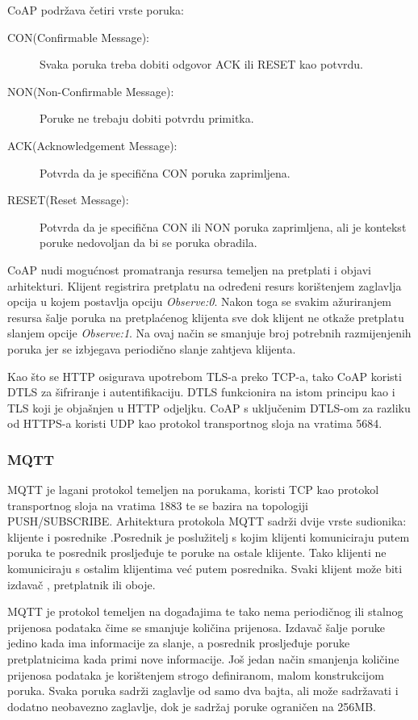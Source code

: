 \documentclass[times, utf8, diplomski]{fer}
\begin{document}
CoAP podržava četiri vrste poruka:
\begin{description}
    \item[CON(Confirmable Message):]Svaka poruka treba dobiti odgovor ACK ili RESET kao potvrdu.
    \item[NON(Non-Confirmable Message):]Poruke ne trebaju dobiti potvrdu primitka.
    \item[ACK(Acknowledgement Message):]Potvrda da je specifična CON poruka zaprimljena.
    \item[RESET(Reset Message):]Potvrda da je specifična CON ili NON poruka zaprimljena, ali je kontekst poruke nedovoljan da bi se poruka obradila.
\end{description}

CoAP nudi mogućnost promatranja resursa temeljen na pretplati i objavi arhitekturi. Klijent registrira pretplatu na određeni resurs korištenjem zaglavlja opcija u kojem postavlja opciju \emph{Observe:0}. Nakon toga se svakim ažuriranjem resursa šalje poruka na pretplaćenog klijenta sve dok klijent ne otkaže pretplatu slanjem opcije \emph{Observe:1}. Na ovaj način se smanjuje broj potrebnih razmijenjenih poruka jer se izbjegava periodično slanje zahtjeva klijenta.

Kao što se HTTP osigurava upotrebom TLS-a preko TCP-a, tako CoAP koristi DTLS  za šifriranje i autentifikaciju. DTLS funkcionira na istom principu kao i TLS koji je objašnjen u HTTP odjeljku. CoAP s uključenim DTLS-om za razliku od HTTPS-a koristi UDP kao protokol transportnog sloja na vratima 5684.

\subsubsection{MQTT}
MQTT  je lagani protokol temeljen na porukama, koristi TCP kao protokol transportnog sloja na vratima 1883 te se bazira na topologiji PUSH/SUBSCRIBE. Arhitektura protokola MQTT sadrži dvije vrste sudionika: klijente i posrednike .Posrednik je poslužitelj s kojim klijenti komuniciraju putem poruka te posrednik prosljeđuje te poruke na ostale klijente. Tako klijenti ne komuniciraju s ostalim klijentima već putem posrednika. Svaki klijent može biti izdavač , pretplatnik  ili oboje. 

MQTT je protokol temeljen na događajima te tako nema periodičnog ili stalnog prijenosa podataka čime se smanjuje količina prijenosa. Izdavač šalje poruke jedino kada ima informacije za slanje, a posrednik prosljeđuje poruke pretplatnicima kada primi nove informacije. Još jedan način smanjenja količine prijenosa podataka je korištenjem strogo definiranom, malom konstrukcijom poruka. Svaka poruka sadrži zaglavlje od samo dva bajta, ali može sadržavati i dodatno neobavezno zaglavlje, dok je sadržaj poruke ograničen na 256MB. 
\end{document}
